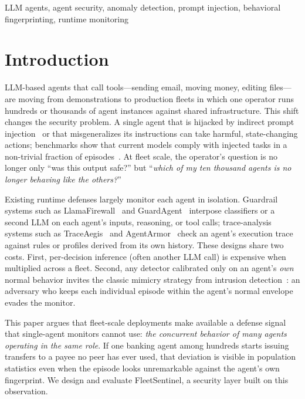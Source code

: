 \documentclass[conference]{IEEEtran}
\newcommand{\sys}{FleetSentinel}
\begin{document}
\begin{IEEEkeywords}
LLM agents, agent security, anomaly detection, prompt injection, behavioral fingerprinting, runtime monitoring
\end{IEEEkeywords}

\section{Introduction}
LLM-based agents that call tools---sending email, moving money, editing files---are moving from demonstrations to production fleets in which one operator runs hundreds or thousands of agent instances against shared infrastructure. This shift changes the security problem. A single agent that is hijacked by indirect prompt injection~\cite{greshake2023} or that misgeneralizes its instructions can take harmful, state-changing actions; benchmarks show that current models comply with injected tasks in a non-trivial fraction of episodes~\cite{debenedetti2024agentdojo,andriushchenko2025agentharm}. At fleet scale, the operator's question is no longer only ``was this output safe?'' but ``\emph{which of my ten thousand agents is no longer behaving like the others?}''

Existing runtime defenses largely monitor each agent in isolation. Guardrail systems such as LlamaFirewall~\cite{chennabasappa2025llamafirewall} and GuardAgent~\cite{xiang2024guardagent} interpose classifiers or a second LLM on each agent's inputs, reasoning, or tool calls; trace-analysis systems such as TraceAegis~\cite{traceaegis2025} and AgentArmor~\cite{agentarmor2025} check an agent's execution trace against rules or profiles derived from its own history. These designs share two costs. First, per-decision inference (often another LLM call) is expensive when multiplied across a fleet. Second, any detector calibrated only on an agent's \emph{own} normal behavior invites the classic mimicry strategy from intrusion detection~\cite{wagner2002mimicry}: an adversary who keeps each individual episode within the agent's normal envelope evades the monitor.

This paper argues that fleet-scale deployments make available a defense signal that single-agent monitors cannot use: \emph{the concurrent behavior of many agents operating in the same role}. If one banking agent among hundreds starts issuing transfers to a payee no peer has ever used, that deviation is visible in population statistics even when the episode looks unremarkable against the agent's own fingerprint. We design and evaluate \sys{}, a security layer built on this observation.
\end{document}
